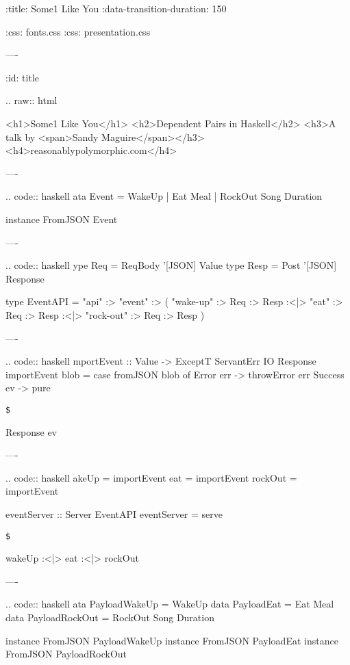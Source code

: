 :title: Some1 Like You
:data-transition-duration: 150

:css: fonts.css
:css: presentation.css

\newenvironment{hs}[1]{.. code:: haskell
}{}
\newenvironment{raw}[1]{.. raw:: html

  <pre>}{
  </pre>
}
\newcommand{\$}{\begin{verbatim}$\end{verbatim}}
\newcommand{\todo}[2]{#2}
\newcommand{\note}[1]{<span class="new">#1</span>}
\newcommand{\wat}[1]{<span class="wat">#1</span>}

----

:id: title

.. raw:: html

  <h1>Some1 Like You</h1>
  <h2>Dependent Pairs in Haskell</h2>
  <h3>A talk by <span>Sandy Maguire</span></h3>
  <h4>reasonablypolymorphic.com</h4>

----

\begin{hs}
  data Event = WakeUp
             | Eat Meal
             | RockOut Song Duration

  instance FromJSON Event
\end{hs}

----

\begin{hs}
  type Req  = ReqBody '[JSON] Value
  type Resp = Post    '[JSON] Response

  type EventAPI = "api" :> "event" :>
         ( "wake-up"  :> Req :> Resp
      :<|> "eat"      :> Req :> Resp
      :<|> "rock-out" :> Req :> Resp
         )
\end{hs}

----

\begin{hs}
  importEvent :: Value -> ExceptT ServantErr IO Response
  importEvent blob =
    case fromJSON blob of
      Error   err -> throwError err
      Success ev  -> pure \$ Response ev
\end{hs}

----

\begin{hs}
  wakeUp  = importEvent
  eat     = importEvent
  rockOut = importEvent

  eventServer :: Server EventAPI
  eventServer = serve \$
    wakeUp :<|> eat :<|> rockOut
\end{hs}

----

\begin{hs}
  data PayloadWakeUp  = \todo{rename these so they dont clash with datakinds later}{WakeUp}
  data PayloadEat     = Eat Meal
  data PayloadRockOut = RockOut Song Duration

  instance FromJSON PayloadWakeUp
  instance FromJSON PayloadEat
  instance FromJSON PayloadRockOut
\end{hs}

